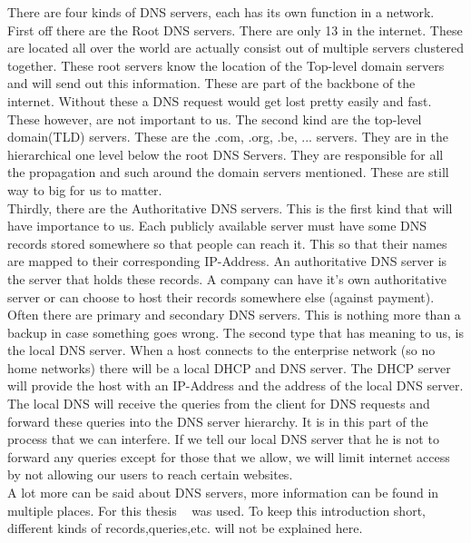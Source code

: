 There are four kinds of DNS servers, each has its own function in a network.\\
First off there are the Root DNS servers. There are only 13 in the internet. These are located all over the world are actually consist out of multiple servers clustered together. These root servers know the location of the Top-level domain servers and will send out this information. These are part of the backbone of the internet. Without these a DNS request would get lost pretty easily and fast. These however, are not important to us. 
The second kind are the top-level domain(TLD) servers. These are the .com, .org, .be, ... servers. They are in the hierarchical  one level below the root DNS Servers. They are responsible for all the propagation and such around the domain servers mentioned. These are still way to big for us to matter.\\
Thirdly, there are the Authoritative DNS servers. This is the first kind that will have importance to us. Each publicly available server must have some DNS records stored somewhere so that people can reach it. This so that their names are mapped to their corresponding IP-Address. An authoritative DNS server is the server that holds these records. A company can have it's own authoritative server or can choose to host their records somewhere else (against payment). Often there are primary and secondary DNS servers. This is nothing more than a backup in case something goes wrong.
The second type that has meaning to us, is the local DNS server. When a host connects to the enterprise network (so no home networks) there will be a local DHCP and DNS server. The DHCP server will provide the host with an IP-Address and the address of the local DNS server. The local DNS will receive the queries from the client for DNS requests and forward these queries into the DNS server hierarchy. It is in this part of the process that we can interfere. If we tell our local DNS server that he is not to forward any queries except for those that we allow, we will limit internet access by not allowing our users to reach certain websites.\\
A lot more can be said about DNS servers, more information can be found in multiple places. For this thesis ~\textcite{NetworkingPearson} was used. To keep this introduction short, different kinds of records,queries,etc. will not be explained here.
